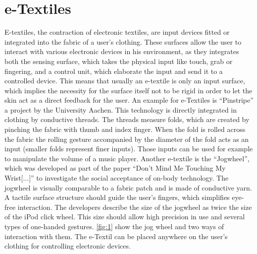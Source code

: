 \documentclass{sigchi}
\begin{document}
\section{e-Textiles}
E-textiles, the contraction of electronic textiles, are input devices fitted or integrated into the fabric of a user's clothing. These surfaces allow the user to interact with various electronic devices in his environment, as they integrates both the sensing surface, which takes the physical input like touch, grab or fingering,  and a control unit, which elaborate the input and send it to a controlled device. This means that usually an e-textile is only an input surface, which implies the necessity for the surface itself not to be rigid in order to let the skin act as a direct feedback for the user.
An example for e-Textiles is “Pinstripe” a project by the University Aachen. This technology is directly integrated in clothing by conductive threads. The threads measure folds, which are created by pinching the fabric with thumb and index finger. When the fold is rolled across the fabric the rolling gesture accompanied by the diameter of the fold acts as an input (smaller folds represent finer inputs). Those inputs can be used for example to manipulate the volume of a music player. \cite{pinstripe}%
Another e-textile is the ``Jogwheel'', which was developed as part of the paper ``Don't Mind Me Touching My Wrist[...]'' \cite{touch-wrist} to investigate the social acceptance of on-body technology. The jogwheel is visually comparable to a fabric patch and is made of conductive yarn. A tactile surface structure should guide the user's fingers, which simplifies eye-free interaction. The developers describe the size of the jogwheel as twice the size of the iPod click wheel. This size should allow high precision in use and several types of one-handed gestures.
\ref{fig:1} show the jog wheel and two ways of interaction with them. The e-Textil can be placed anywhere on the user's clothing for controlling electronic devices. \cite{touch-wrist}
\end{document}
